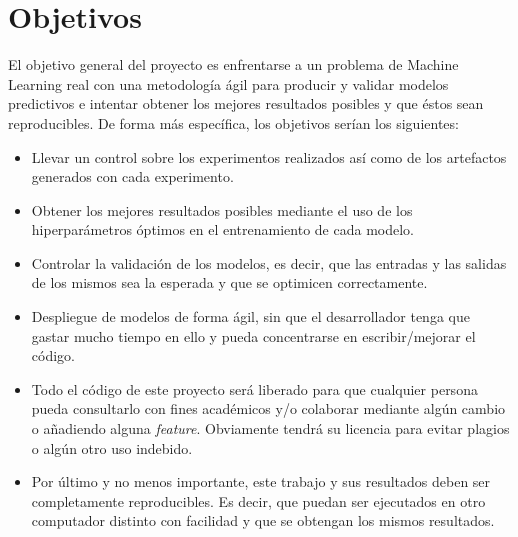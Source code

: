 \chapter{Objetivos}

El objetivo general del proyecto es enfrentarse a un problema de Machine Learning real con una metodología ágil para producir y validar modelos predictivos e intentar obtener los mejores resultados posibles y que éstos sean reproducibles. De forma más específica, los objetivos serían los siguientes:

\begin{itemize}
	\item Llevar un control sobre los experimentos realizados así como de los artefactos generados con cada experimento.
	\item Obtener los mejores resultados posibles mediante el uso de los hiperparámetros óptimos en el entrenamiento de cada modelo.
	\item Controlar la validación de los modelos, es decir, que las entradas y las salidas de los mismos sea la esperada y que se optimicen correctamente.
	\item Despliegue de modelos de forma ágil, sin que el desarrollador tenga que gastar mucho tiempo en ello y pueda concentrarse en escribir/mejorar el código.
	\item Todo el código de este proyecto será liberado para que cualquier persona pueda consultarlo con fines académicos y/o colaborar mediante algún cambio o añadiendo alguna \textit{feature}. Obviamente tendrá su licencia para evitar plagios o algún otro uso indebido.
	\item Por último y no menos importante, este trabajo y sus resultados deben ser completamente reproducibles. Es decir, que puedan ser ejecutados en otro computador distinto con facilidad y que se obtengan los mismos resultados.
\end{itemize}